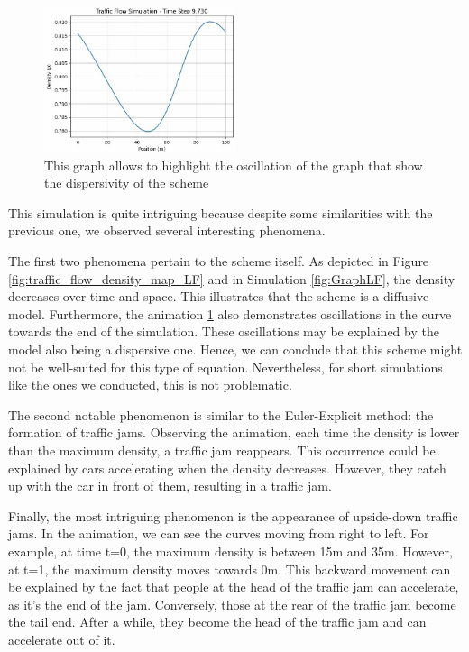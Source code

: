 \documentclass{article}
\begin{document}
	\begin{figure}[H]
		\centering
		\includegraphics[width=0.5\textwidth]{AniE5_LF.jpg}
		\caption[scheme dispersivity]{This graph allows to highlight  the oscillation of the graph that show the dispersivity of the scheme}
		\label{fig:Dis}
	\end{figure}
	
	This simulation is quite intriguing because despite some similarities with the previous one, we observed several interesting phenomena.
	
	The first two phenomena pertain to the scheme itself. As depicted in Figure \ref{fig:traffic_flow_density_map_LF} and in Simulation \ref{fig:GraphLF}, the density decreases over time and space. This illustrates that the scheme is a diffusive model. Furthermore, the animation \ref{fig:Dis} also demonstrates oscillations in the curve towards the end of the simulation. These oscillations may be explained by the model also being a dispersive one. Hence, we can conclude that this scheme might not be well-suited for this type of equation. Nevertheless, for short simulations like the ones we conducted, this is not problematic.
	
	The second notable phenomenon is similar to the Euler-Explicit method: the formation of traffic jams. Observing the animation, each time the density is lower than the maximum density, a traffic jam reappears. This occurrence could be explained by cars accelerating when the density decreases. However, they catch up with the car in front of them, resulting in a traffic jam.
	
	Finally, the most intriguing phenomenon is the appearance of upside-down traffic jams. In the animation, we can see the curves moving from right to left. For example, at time t=0, the maximum density is between 15m and 35m. However, at t=1, the maximum density moves towards 0m. This backward movement can be explained by the fact that people at the head of the traffic jam can accelerate, as it's the end of the jam. Conversely, those at the rear of the traffic jam become the tail end. After a while, they become the head of the traffic jam and can accelerate out of it.
\end{document}
